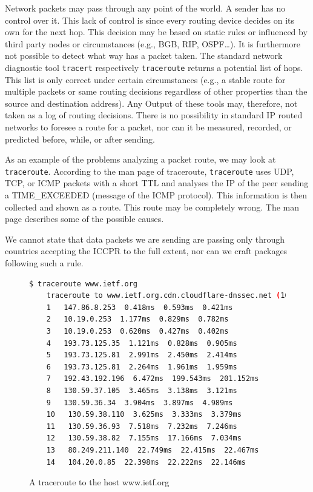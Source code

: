 Network packets may pass through any point of the world. A sender has no control over it. This lack of control is since every routing device decides on its own for the next hop. This decision may be based on static rules or influenced by third party nodes or circumstances (e.g., BGB, RIP, OSPF\ldots). It is furthermore not possible to detect what way has a packet taken. The standard network diagnostic tool \verb|tracert| respectively \verb|traceroute| returns a potential list of hops. This list is only correct under certain circumstances (e.g., a stable route for multiple packets or same routing decisions regardless of other properties than the source and destination address). Any Output of these tools may, therefore, not taken as a log of routing decisions. There is no possibility in standard IP routed networks to foresee a route for a packet, nor can it be measured, recorded, or predicted before, while, or after sending. 

As an example of the problems analyzing a packet route, we may look at \verb|traceroute|. According to the man page of traceroute, \verb|traceroute| uses UDP, TCP, or ICMP packets with a short TTL and analyses the IP of the peer sending a TIME\_EXCEEDED (message of the ICMP protocol). This information is then collected and shown as a route. This route may be completely wrong. The man page describes some of the possible causes.

We cannot state that data packets we are sending are passing only through countries accepting the ICCPR to the full extent, nor can we craft packages following such a rule.

\begin{figure}[H]
	\begin{lstlisting}[language=bash,breaklines=true,basicstyle=\tiny]
	$ traceroute www.ietf.org
	traceroute to www.ietf.org.cdn.cloudflare-dnssec.net (104.20.0.85), 64 hops max
	1   147.86.8.253  0.418ms  0.593ms  0.421ms
	2   10.19.0.253  1.177ms  0.829ms  0.782ms
	3   10.19.0.253  0.620ms  0.427ms  0.402ms
	4   193.73.125.35  1.121ms  0.828ms  0.905ms
	5   193.73.125.81  2.991ms  2.450ms  2.414ms
	6   193.73.125.81  2.264ms  1.961ms  1.959ms
	7   192.43.192.196  6.472ms  199.543ms  201.152ms
	8   130.59.37.105  3.465ms  3.138ms  3.121ms
	9   130.59.36.34  3.904ms  3.897ms  4.989ms
	10   130.59.38.110  3.625ms  3.333ms  3.379ms
	11   130.59.36.93  7.518ms  7.232ms  7.246ms
	12   130.59.38.82  7.155ms  17.166ms  7.034ms
	13   80.249.211.140  22.749ms  22.415ms  22.467ms
	14   104.20.0.85  22.398ms  22.222ms  22.146ms
	\end{lstlisting}
	\caption{A traceroute to the host www.ietf.org}
\end{figure}

